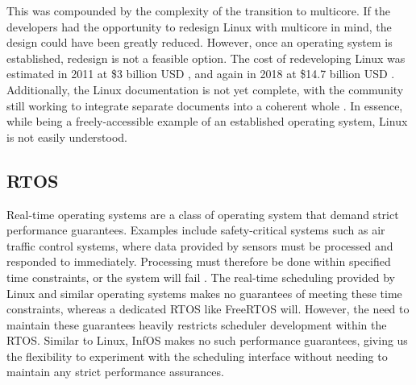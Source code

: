 \documentclass[bsc,frontabs,singlespacing,parskip,deptreport]{infthesis}
\begin{document}
This was compounded by the complexity of the transition to multicore. If the developers had the opportunity to redesign Linux with multicore in mind, the design could have been greatly reduced. However, once an operating system is established, redesign is not a feasible option. The cost of redeveloping Linux was estimated in 2011 at \$3 billion USD \cite{linux-kernel-cost}, and again in 2018 at \$14.7 billion USD \cite{cost-to-redev}. Additionally, the Linux documentation is not yet complete, with the community still working to integrate separate documents into a coherent whole \cite{linux-docs}. In essence, while being a freely-accessible example of an established operating system, Linux is not easily understood.

\subsection{RTOS}
Real-time operating systems are a class of operating system that demand strict performance guarantees. Examples include safety-critical systems such as air traffic control systems, where data provided by sensors must be processed and responded to immediately. Processing must therefore be done within specified time constraints, or the system will fail \cite{silberschatz}. The real-time scheduling provided by Linux and similar operating systems makes no guarantees of meeting these time constraints, whereas a dedicated RTOS like FreeRTOS \cite{free-rtos} will. However, the need to maintain these guarantees heavily restricts scheduler development within the RTOS. Similar to Linux, InfOS makes no such performance guarantees, giving us the flexibility to experiment with the scheduling interface without needing to maintain any strict performance assurances.
\end{document}

